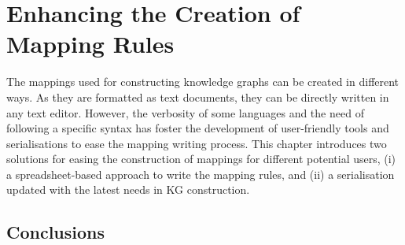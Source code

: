 
\chapter{Enhancing the Creation of Mapping Rules}
\label{chapter:creation}

The mappings used for constructing knowledge graphs can be created in different ways. As they are formatted as text documents, they can be directly written in any text editor. However, the verbosity of some languages and the need of following a specific syntax has foster the development of user-friendly tools and serialisations to ease the mapping writing process. This chapter introduces two solutions for easing the construction of mappings for different potential users, (i) a spreadsheet-based approach to write the mapping rules, and (ii) a serialisation updated with the latest needs in KG construction.





\section{Conclusions}